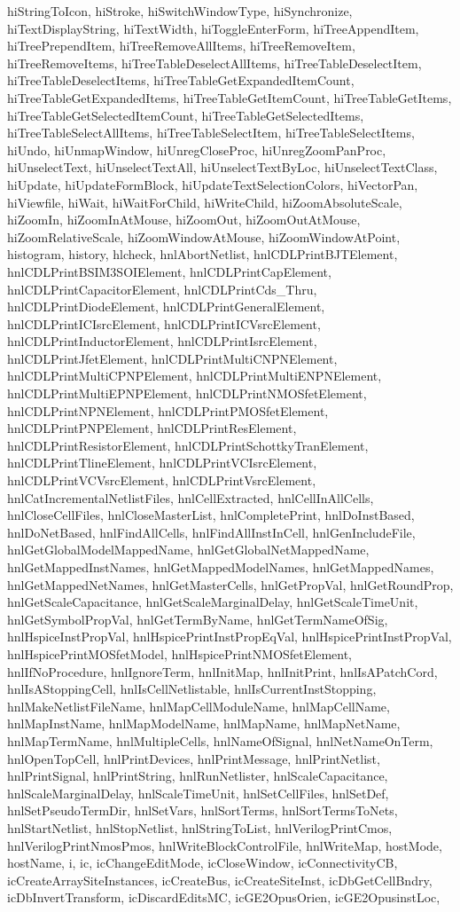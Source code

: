 {{hiStringToIcon, hiStroke, hiSwitchWindowType, hiSynchronize, hiTextDisplayString, hiTextWidth, hiToggleEnterForm, hiTreeAppendItem, hiTreePrependItem, hiTreeRemoveAllItems, hiTreeRemoveItem, hiTreeRemoveItems, hiTreeTableDeselectAllItems, hiTreeTableDeselectItem, hiTreeTableDeselectItems, hiTreeTableGetExpandedItemCount, hiTreeTableGetExpandedItems, hiTreeTableGetItemCount, hiTreeTableGetItems, hiTreeTableGetSelectedItemCount, hiTreeTableGetSelectedItems, hiTreeTableSelectAllItems, hiTreeTableSelectItem, hiTreeTableSelectItems, hiUndo, hiUnmapWindow, hiUnregCloseProc, hiUnregZoomPanProc, hiUnselectText, hiUnselectTextAll, hiUnselectTextByLoc, hiUnselectTextClass, hiUpdate, hiUpdateFormBlock, hiUpdateTextSelectionColors, hiVectorPan, hiViewfile, hiWait, hiWaitForChild, hiWriteChild, hiZoomAbsoluteScale, hiZoomIn, hiZoomInAtMouse, hiZoomOut, hiZoomOutAtMouse, hiZoomRelativeScale, hiZoomWindowAtMouse, hiZoomWindowAtPoint, histogram, history, hlcheck, hnlAbortNetlist, hnlCDLPrintBJTElement, hnlCDLPrintBSIM3SOIElement, hnlCDLPrintCapElement, hnlCDLPrintCapacitorElement, hnlCDLPrintCds_Thru, hnlCDLPrintDiodeElement, hnlCDLPrintGeneralElement, hnlCDLPrintICIsrcElement, hnlCDLPrintICVsrcElement, hnlCDLPrintInductorElement, hnlCDLPrintIsrcElement, hnlCDLPrintJfetElement, hnlCDLPrintMultiCNPNElement, hnlCDLPrintMultiCPNPElement, hnlCDLPrintMultiENPNElement, hnlCDLPrintMultiEPNPElement, hnlCDLPrintNMOSfetElement, hnlCDLPrintNPNElement, hnlCDLPrintPMOSfetElement, hnlCDLPrintPNPElement, hnlCDLPrintResElement, hnlCDLPrintResistorElement, hnlCDLPrintSchottkyTranElement, hnlCDLPrintTlineElement, hnlCDLPrintVCIsrcElement, hnlCDLPrintVCVsrcElement, hnlCDLPrintVsrcElement, hnlCatIncrementalNetlistFiles, hnlCellExtracted, hnlCellInAllCells, hnlCloseCellFiles, hnlCloseMasterList, hnlCompletePrint, hnlDoInstBased, hnlDoNetBased, hnlFindAllCells, hnlFindAllInstInCell, hnlGenIncludeFile, hnlGetGlobalModelMappedName, hnlGetGlobalNetMappedName, hnlGetMappedInstNames, hnlGetMappedModelNames, hnlGetMappedNames, hnlGetMappedNetNames, hnlGetMasterCells, hnlGetPropVal, hnlGetRoundProp, hnlGetScaleCapacitance, hnlGetScaleMarginalDelay, hnlGetScaleTimeUnit, hnlGetSymbolPropVal, hnlGetTermByName, hnlGetTermNameOfSig, hnlHspiceInstPropVal, hnlHspicePrintInstPropEqVal, hnlHspicePrintInstPropVal, hnlHspicePrintMOSfetModel, hnlHspicePrintNMOSfetElement, hnlIfNoProcedure, hnlIgnoreTerm, hnlInitMap, hnlInitPrint, hnlIsAPatchCord, hnlIsAStoppingCell, hnlIsCellNetlistable, hnlIsCurrentInstStopping, hnlMakeNetlistFileName, hnlMapCellModuleName, hnlMapCellName, hnlMapInstName, hnlMapModelName, hnlMapName, hnlMapNetName, hnlMapTermName, hnlMultipleCells, hnlNameOfSignal, hnlNetNameOnTerm, hnlOpenTopCell, hnlPrintDevices, hnlPrintMessage, hnlPrintNetlist, hnlPrintSignal, hnlPrintString, hnlRunNetlister, hnlScaleCapacitance, hnlScaleMarginalDelay, hnlScaleTimeUnit, hnlSetCellFiles, hnlSetDef, hnlSetPseudoTermDir, hnlSetVars, hnlSortTerms, hnlSortTermsToNets, hnlStartNetlist, hnlStopNetlist, hnlStringToList, hnlVerilogPrintCmos, hnlVerilogPrintNmosPmos, hnlWriteBlockControlFile, hnlWriteMap, hostMode, hostName, i, ic, icChangeEditMode, icCloseWindow, icConnectivityCB, icCreateArraySiteInstances, icCreateBus, icCreateSiteInst, icDbGetCellBndry, icDbInvertTransform, icDiscardEditsMC, icGE2OpusOrien, icGE2OpusinstLoc, }}
